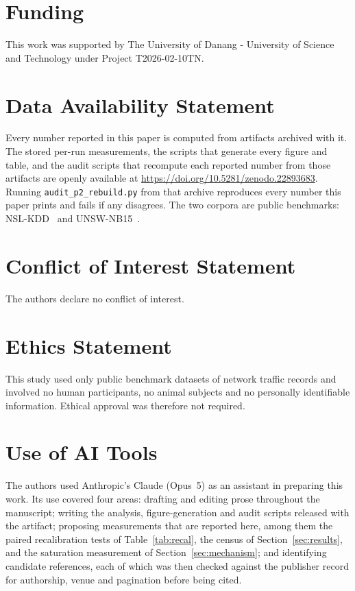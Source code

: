 \documentclass[journal]{IEEEtran}
\begin{document}
\section*{Funding}
This work was supported by The University of Danang - University of Science
and Technology under Project T2026-02-10TN.

\section*{Data Availability Statement}
Every number reported in this paper is computed from artifacts archived with
it. The stored per-run measurements, the scripts that generate every figure
and table, and the audit scripts that recompute each reported number from
those artifacts are openly available at
\url{https://doi.org/10.5281/zenodo.22893683}. Running
\texttt{audit\_p2\_rebuild.py} from that archive reproduces every number
this paper prints and fails if any disagrees. The two corpora are public
benchmarks: NSL-KDD~\cite{tavallaee2009nslkdd} and
UNSW-NB15~\cite{moustafa2015unsw}.

\section*{Conflict of Interest Statement}
The authors declare no conflict of interest.

\section*{Ethics Statement}
This study used only public benchmark datasets of network traffic records and
involved no human participants, no animal subjects and no personally
identifiable information. Ethical approval was therefore not required.

\section*{Use of AI Tools}
The authors used Anthropic's Claude (Opus~5) as an assistant in preparing
this work. Its use covered four areas: drafting and editing prose throughout
the manuscript; writing the analysis, figure-generation and audit scripts
released with the artifact; proposing measurements that are reported here,
among them the paired recalibration tests of Table~\ref{tab:recal}, the
census of Section~\ref{sec:results}, and the saturation measurement of
Section~\ref{sec:mechanism}; and identifying candidate references, each of
which was then checked against the publisher record for authorship, venue
and pagination before being cited.
\end{document}
